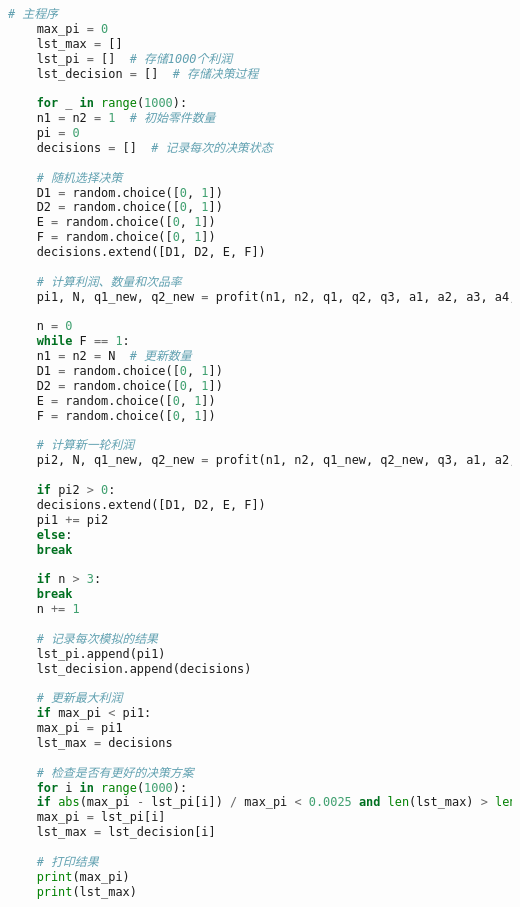 \documentclass[withoutpreface,bwprint]{cumcmthesis} %
\begin{document}
\begin{lstlisting}[language=python]
 	# 主程序
 	max_pi = 0
 	lst_max = []
 	lst_pi = []  # 存储1000个利润
 	lst_decision = []  # 存储决策过程
 	
 	for _ in range(1000):
 	n1 = n2 = 1  # 初始零件数量
 	pi = 0
 	decisions = []  # 记录每次的决策状态
 	
 	# 随机选择决策
 	D1 = random.choice([0, 1])
 	D2 = random.choice([0, 1])
 	E = random.choice([0, 1])
 	F = random.choice([0, 1])
 	decisions.extend([D1, D2, E, F])
 	
 	# 计算利润、数量和次品率
 	pi1, N, q1_new, q2_new = profit(n1, n2, q1, q2, q3, a1, a2, a3, a4, a5, a6, a7, a8, a9, D1, D2, E, F)
 	
 	n = 0
 	while F == 1:
 	n1 = n2 = N  # 更新数量
 	D1 = random.choice([0, 1])
 	D2 = random.choice([0, 1])
 	E = random.choice([0, 1])
 	F = random.choice([0, 1])
 	
 	# 计算新一轮利润
 	pi2, N, q1_new, q2_new = profit(n1, n2, q1_new, q2_new, q3, a1, a2, a3, a4, a5, a6, a7, a8, a9, D1, D2, E, F)
 	
 	if pi2 > 0:
 	decisions.extend([D1, D2, E, F])
 	pi1 += pi2
 	else:
 	break
 	
 	if n > 3:
 	break
 	n += 1
 	
 	# 记录每次模拟的结果
 	lst_pi.append(pi1)
 	lst_decision.append(decisions)
 	
 	# 更新最大利润
 	if max_pi < pi1:
 	max_pi = pi1
 	lst_max = decisions
 	
 	# 检查是否有更好的决策方案
 	for i in range(1000):
 	if abs(max_pi - lst_pi[i]) / max_pi < 0.0025 and len(lst_max) > len(lst_decision[i]):
 	max_pi = lst_pi[i]
 	lst_max = lst_decision[i]
 	
 	# 打印结果
 	print(max_pi)
 	print(lst_max)
 	
 \end{lstlisting}
 
\end{document}
